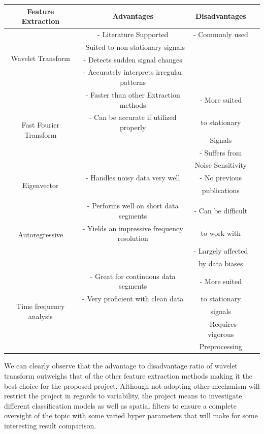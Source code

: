 \documentclass[12pt]{article}
\begin{document}
\begin{center}
\begin{tabular}{ |c|c|c|c| } 
\hline
Feature Extraction & Advantages & Disadvantages\\
\hline
\multirow{4}{5em}{Wavelet Transform}
& - Literature Supported & - Commonly used \\ 
& - Suited to non-stationary signals  & \\ 
& - Detects sudden signal changes &  \\ 
& - Accurately interprets irregular patterns & \\
\hline
\multirow{5}{5em}{Fast Fourier Transform}
&- Faster than other Extraction methods  & -  More suited \\ 
&- Can be accurate if utilized properly & to stationary\\ 
&  & Signals \\ 
&  & - Suffers from \\ 
&  & Noise Sensitivity\\ 
\hline
\multirow{3}{4em}{Eigenvector}
& - Handles noisy data very well  & - No previous\\ 
& & publications \\ 
& &  \\ 
\hline
\multirow{4}{5em}{Autoregressive}
& - Performs well on short data segments & - Can be difficult \\ 
& - Yields an impressive frequency resolution & to work with \\ 
&  & - Largely affected \\
&  & by data biases \\
\hline
\multirow{5}{5em}{Time frequency analysis}
& - Great for continuous data segments & - More suited \\ 
& - Very proficient with clean data  & to stationary \\ 
&  & signals \\ 
&  & - Requires vigorous \\ 
& & Preprocessing \\
\hline
\end{tabular}
\end{center}

We can clearly observe that the advantage to disadvantage ratio of wavelet transform outweighs that of the other feature extraction methods making it the best choice for the proposed project. Although not adopting other mechanism will restrict the project in regards to variability, the project means to investigate different classification models as well as spatial filters to ensure a complete oversight of the topic with some varied hyper parameters that will make for some interesting result comparison. 
\end{document}
